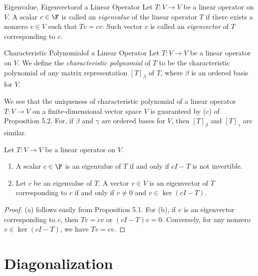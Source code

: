 \documentclass[linearalgebraI]{subfiles}
\begin{document}
    \begin{definition}{Eigenvalue, Eigenvector}{of a Linear Operator}
        Let $T: V\to V$ be a linear operator on $V$. A scalar $c\in\F$ is called an \emph{eigenvalue} of the linear operator $T$ if there exists a nonzero $v\in  V$ such that $Tv = c v$. Such vector $v$ is called an \emph{eigenvector} of $T$ corresponding to $c$.
    \end{definition}

    \begin{definition}{Characteristic Polynomial}{of a Linear Operator}
        Let $T:V\to V$ be a linear operator on $V$. We define the \emph{characteristic polynomial} of $T$ to be the characteristic polynomial of any matrix representation $\left[ T \right] _\beta$ of $T$, where $\beta$ is an ordered basis for $V$. 
    \end{definition}

    \begin{remark}
        We see that the uniqueness of characteristic polynomial of a linear operator $T:V\to V$ on a finite-dimensional vector space $V$ is guaranteed by (c) of Proposition 5.2. For, if $\beta$ and $\gamma$ are ordered bases for $V$, then $\left[ T \right]_\beta$ and $\left[ T \right] _\gamma$ are similar. 
    \end{remark}

    \begin{prop}{}
        Let $T:V\to V$ be a linear operator on $V$. 
        \begin{enumerate}
            \item A scalar $c\in\F$ is an eigenvalue of $T$ if and only if $cI-T$ is not invertible.
            \item Let $c$ be an eigenvalue of $T$. A vector $v\in V$ is an eigenvector of $T$ corresponding to $c$ if and only if $v\neq 0$ and $v\in \ker(cI-T)$.
        \end{enumerate}
    \end{prop}

    \begin{proof}
        (a) follows easily from Proposition 5.1. For (b), if $v$ is an eigenvector corresponding to $c$, then $Tv=c v$ or $\left( cI-T \right) v = 0$. Conversely, for any nonzero $v\in\ker\left( cI-T \right)$, we have $Tv = cv$.
    \end{proof}

    \section{Diagonalization}
\end{document}
